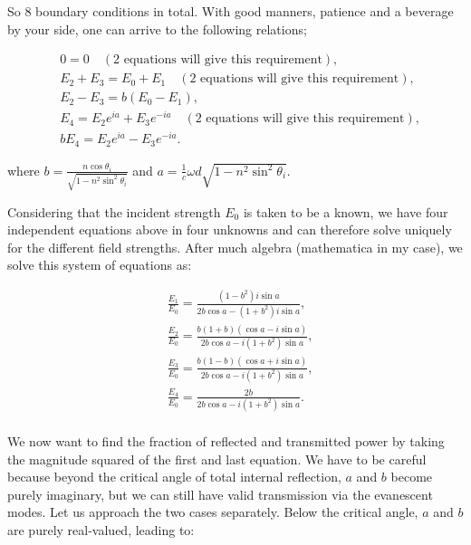So 8 boundary conditions in total. With good manners, patience and a beverage by your side, one can arrive to the following relations;

\begin{equation}\label{interfaseconditions}
	\begin{split}
		&0=0 \quad (\text{2 equations will give this requirement}),\\
		&E_{2}+E_{3}=E_{0}+E_{1} \quad (\text{2 equations will give this requirement}),\\
		&E_{2}-E_{3}=b\left(E_{0}-E_{1}\right),\\
		&E_{4}=E_{2} e^{i a}+E_{3} e^{-i a} \quad (\text{2 equations will give this requirement}),\\
		&b E_{4}=E_{2} e^{i a}-E_{3} e^{-i a}.
	\end{split}
\end{equation}

where $b=\frac{n \cos \theta_{i}}{\sqrt{1-n^{2} \sin ^{2} \theta_{i}}}$ and  $a=\frac{1}{c} \omega d \sqrt{1-n^{2} \sin ^{2} \theta_{i}}$.

Considering that the incident strength $E_{0}$ is taken to be a known, we have four independent equations above in four unknowns and can therefore solve uniquely for the different field strengths. After much algebra (mathematica in my case), we solve this system of equations as:

\begin{equation}
	\begin{split}
		&\frac{E_{1}}{E_{0}}=\frac{\left(1-b^{2}\right) i \sin a}{2 b \cos a-\left(1+b^{2}\right) i \sin a},\\
		&\frac{E_{2}}{E_{0}}=\frac{b(1+b)(\cos a-i \sin a)}{2 b \cos a-i\left(1+b^{2}\right) \sin a},\\
		&\frac{E_{3}}{E_{0}}=\frac{b(1-b)(\cos a+i \sin a)}{2 b \cos a-i\left(1+b^{2}\right) \sin a},\\
		&\frac{E_{4}}{E_{0}}=\frac{2 b}{2 b \cos a-i\left(1+b^{2}\right) \sin a}.\\
	\end{split}
\end{equation}

We now want to find the fraction of reflected and transmitted power by taking the magnitude squared of the first and last equation. We have to be careful because beyond the critical angle of total internal reflection, $a$ and $b$ become purely imaginary, but we can still have valid transmission via the evanescent modes. Let us approach the two cases separately. Below the critical angle, $a$ and $b$ are purely real-valued, leading to:

